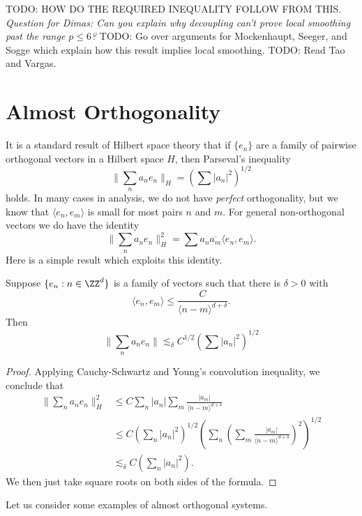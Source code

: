 TODO: HOW DO THE REQUIRED INEQUALITY FOLLOW FROM THIS. \emph{Question for Dimas: Can you explain why decoupling can't prove local smoothing past the range $p \leq 6$?} TODO: Go over arguments for Mockenhaupt, Seeger, and Sogge which explain how this result implies local smoothing. TODO: Read Tao and Vargas.










\chapter{Almost Orthogonality}

It is a standard result of Hilbert space theory that if $\{ e_n \}$ are a family of pairwise orthogonal vectors in a Hilbert space $H$, then Parseval's inequality
%
\[ \| \sum_n a_n e_n \|_H = \left( \sum |a_n|^2 \right)^{1/2} \]
%
holds. In many cases in analysis, we do not have \emph{perfect} orthogonality, but we know that $\langle e_n, e_m \rangle$ is small for most pairs $n$ and $m$. For general non-orthogonal vectors we do have the identity
%
\[ \| \sum_n a_n e_n \|_H^2 = \sum a_n \overline{a_m} \langle e_n, e_m \rangle. \]
%
Here is a simple result which exploits this identity.

\begin{lemma}
  Suppose $\{ e_n : n \in \ZZ^d \}$ is a family of vectors such that there is $\delta > 0$ with
  \[ \langle e_n, e_m \rangle \leq \frac{C}{\langle n - m \rangle^{d + \delta}}. \]
  Then
  \[ \| \sum_n a_n e_n \| \lesssim_\delta C^{1/2} \left( \sum |a_n|^2 \right)^{1/2} \]
\end{lemma}
\begin{proof}
  Applying Cauchy-Schwartz and Young's convolution inequality, we conclude that
  \begin{align*}
    \| \sum_n a_n e_n \|_H^2 &\leq C \sum_n |a_n| \sum_m \frac{|a_m|}{\langle n - m \rangle^{d + \delta}}\\
    &\leq C \left( \sum_n |a_n|^2 \right)^{1/2} \left( \sum_n \left( \sum_m \frac{|a_m|}{\langle n - m \rangle^{d + \delta}} \right)^2 \right)^{1/2}\\
    &\lesssim_\delta C \left( \sum_n |a_n|^2 \right).
  \end{align*}
  We then just take square roots on both sides of the formula.
\end{proof}

Let us consider some examples of almost orthogonal systems.

